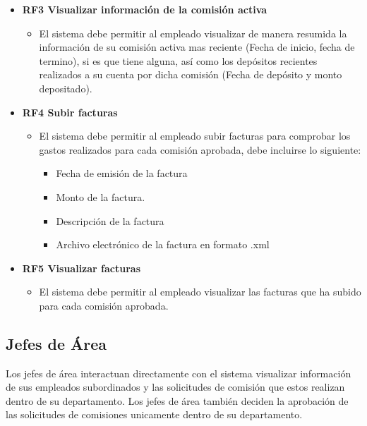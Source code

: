 \begin{itemize}
	\item \textbf{RF3 Visualizar información de la comisión activa}
	\begin{itemize}
		\item El sistema debe permitir al empleado visualizar de manera resumida la información de su comisión activa mas reciente (Fecha de inicio, fecha de termino), si es que tiene alguna, así como los depósitos recientes realizados a su cuenta por dicha comisión (Fecha de depósito y monto depositado).
	\end{itemize}

	
	\item \textbf{RF4 Subir facturas}
	\begin{itemize}
		\item El sistema debe permitir al empleado subir facturas para comprobar los gastos realizados para cada comisión aprobada, debe incluirse lo siguiente:
		\begin{itemize}
			\item Fecha de emisión de la factura
			\item Monto de la factura.
			\item Descripción de la factura
			\item Archivo electrónico de la factura en formato .xml
		\end{itemize}
	\end{itemize}

	\item \textbf{RF5 Visualizar facturas}
	\begin{itemize}
		\item El sistema debe permitir al empleado visualizar las facturas que ha subido para cada comisión aprobada.
	\end{itemize}
\end{itemize}

\subsection{Jefes de Área}


Los jefes de área interactuan directamente con el sistema visualizar información de sus empleados subordinados y las solicitudes de comisión que estos realizan dentro de su departamento. Los jefes de área también deciden la aprobación de las solicitudes de comisiones unicamente dentro de su departamento.

